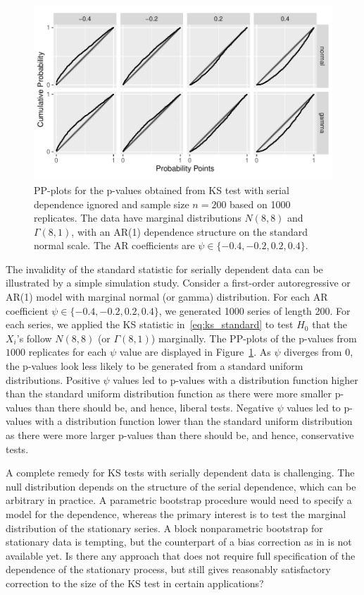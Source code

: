 \documentclass[12pt, letterpaper, titlepage]{article}
\begin{document}
\begin{figure}[tbp]
  \centering
  \includegraphics[width=\textwidth]{pp_s.pdf}
  \caption{PP-plots for the p-values obtained from KS test with serial
    dependence ignored and sample size $n = 200$ based on 1000
    replicates. The data have marginal distributions $N(8, 8)$ and
    $\Gamma(8, 1)$, with an AR(1) dependence structure on the standard normal
    scale. The AR coefficients are $\psi \in \{-0.4, -0.2,  0.2,  0.4\}$.
  }
  \label{fig:pp_s}
\end{figure}


The invalidity of the standard statistic for serially dependent data can be
illustrated by a simple simulation study. Consider a first-order autoregressive
or AR(1) model with marginal normal (or gamma) distribution. For each AR
coefficient $\psi \in \{-0.4, -0.2, 0.2, 0.4\}$, we generated 1000
series of length 200. For each series, we applied the KS statistic
in~\eqref{eq:ks_standard} to test $H_0$ that the $X_i$'s follow $N(8, 8)$ (or 
$\Gamma(8,1)$) marginally. The PP-plots of the p-values from $1000$ replicates 
for each $\psi$ value are displayed in Figure~\ref{fig:pp_s}. As 
$\psi$ diverges from 0, the p-values look less likely to be generated from a 
standard uniform distributions. Positive $\psi$ values led to p-values with a 
distribution function higher than the standard uniform distribution function as 
there were more smaller p-values than there should be, and hence, 
liberal tests. Negative $\psi$ values led to p-values with a 
distribution function lower than the standard uniform distribution as there 
were more larger p-values than there should be, and hence, conservative tests.


A complete remedy for KS tests with serially dependent data is
challenging. The null distribution depends on the structure of the serial
dependence, which can be arbitrary in practice. A parametric bootstrap procedure
would need to specify a model for the dependence, whereas the primary interest
is to test the marginal distribution of the stationary series. A block
nonparametric bootstrap for stationary data \citep{kunsch1989jackknife} is
tempting, but the counterpart of a bias correction as in
\citet{babu2004goodness} is not available yet. Is there any approach that does
not require full specification of the dependence of the stationary process,
but still gives reasonably satisfactory correction to the size of the KS test in
certain applications?
\end{document}
